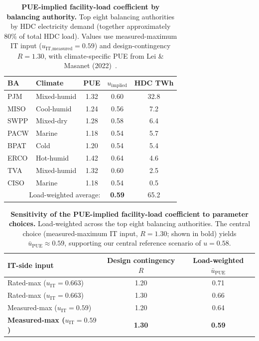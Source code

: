 \documentclass[12pt]{article}
\begin{document}
\begin{table}[H]
\centering
\caption{\textbf{PUE-implied facility-load coefficient by balancing
authority.} Top eight balancing authorities by HDC electricity demand
(together approximately 80\% of total HDC load). Values use measured-maximum IT input
($u_{\text{IT,measured}} = 0.59$) and design-contingency $R = 1.30$, with
climate-specific PUE from Lei \& Masanet (2022)~\cite{lei2022climatepue}.}
\label{tab:pue_implied}
\begin{tabular}{llccc}
\toprule
BA   & Climate     & PUE  & $u_{\text{implied}}$ & HDC TWh \\
\midrule
PJM  & Mixed-humid & 1.32 & 0.60 & 32.8 \\
MISO & Cool-humid  & 1.24 & 0.56 &  7.2 \\
SWPP & Mixed-dry   & 1.28 & 0.58 &  6.4 \\
PACW & Marine      & 1.18 & 0.54 &  5.7 \\
BPAT & Cold        & 1.20 & 0.54 &  5.4 \\
ERCO & Hot-humid   & 1.42 & 0.64 &  4.6 \\
TVA  & Mixed-humid & 1.32 & 0.60 &  2.5 \\
CISO & Marine      & 1.18 & 0.54 &  0.5 \\
\midrule
\multicolumn{3}{r}{Load-weighted average:} & \textbf{0.59} & 65.2 \\
\bottomrule
\end{tabular}
\end{table}

\begin{table}[H]
\centering
\caption{\textbf{Sensitivity of the PUE-implied facility-load coefficient
to parameter choices.} Load-weighted across the top eight balancing
authorities. The central choice (measured-maximum IT input, $R=1.30$;
shown in bold) yields $\bar{u}_{\text{PUE}} \approx 0.59$, supporting our
central reference scenario of $u = 0.58$.}
\label{tab:pue_sensitivity}
\begin{tabular}{lcc}
\toprule
IT-side input & Design contingency $R$ & Load-weighted $\bar{u}_{\text{PUE}}$ \\
\midrule
Rated-max ($u_{\text{IT}}=0.663$)    & 1.20 & 0.71 \\
Rated-max ($u_{\text{IT}}=0.663$)    & 1.30 & 0.66 \\
Measured-max ($u_{\text{IT}}=0.59$) & 1.20 & 0.64 \\
\textbf{Measured-max ($u_{\text{IT}}=0.59$)} & \textbf{1.30} & \textbf{0.59} \\
\bottomrule
\end{tabular}
\end{table}
\end{document}
